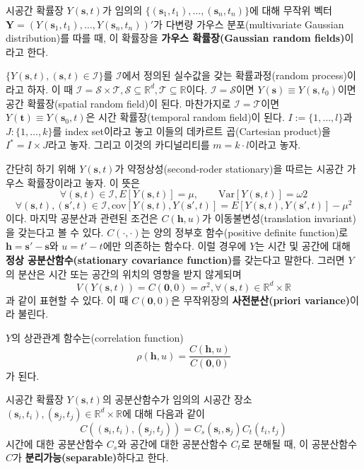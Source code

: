 \documentclass[b5paper,]{scrbook}
\theoremstyle{plain}
\theoremstyle{definition}
\numberwithin{equation}{section}
\let\BeginKnitrBlock\begin \let\EndKnitrBlock\end
\begin{document}
\BeginKnitrBlock{definition}[가우스 확률장]
\protect\hypertarget{def:unnamed-chunk-377}{}{\label{def:unnamed-chunk-377} {} }시공간 확률장 \(Y(\mathbf{s},t)\)가 임의의 \(\{(\mathbf{s}_{1},t_{1}),\ldots , (\mathbf{s}_{n},t_{n})\}\)에 대해 무작위 벡터 \(\mathbf{Y}=(Y(\mathbf{s}_{1},t_{1}),\ldots , Y(\mathbf{s}_{n},t_{n}) )'\)가 다변량 가우스 분포(multivariate Gaussian distribution)를 따를 때, 이 확률장을 \textbf{가우스 확률장(Gaussian random fields)}이라고 한다.
\EndKnitrBlock{definition}

\(\{ Y(\mathbf{s},t), (\mathbf{s},t) \in \mathcal{I}\}\)를 \(\mathcal{I}\)에서 정의된 실수값을 갖는 확률과정(random process)이라고 하자. 이 때 \(\mathcal{I}=\mathcal{S}\times\mathcal{T}, \mathcal{S}\subseteq \mathbb{R}^{d}, \mathcal{T}\subseteq \mathbb{R}\)이다. \(\mathcal{I}=\mathcal{S}\)이면 \(Y(\mathbf{s})\equiv Y(\mathbf{s},t_{0})\)이면 공간 확률장(spatial random field)이 된다. 마찬가지로 \(\mathcal{I}=\mathcal{T}\)이면 \(Y(\mathbf{t})\equiv Y(\mathbf{s}_{0},t)\)은 시간 확률장(temporal random field)이 된다. \(I:=\{1,\ldots , l\}\)과 \(J:\{ 1, \ldots, k \}\)를 index set이라고 놓고 이들의 데카르트 곱(Cartesian product)을 \(I^{*}=I\times J\)라고 놓자. 그리고 이것의 카디널리티를 \(m=k\cdot l\)이라고 놓자.

간단히 하기 위해 \(Y(\mathbf{s},t)\)가 약정상성(second-roder stationary)을 따르는 시공간 가우스 확률장이라고 놓자. 이 뜻은
\[\forall (\mathbf{s},t)\in\mathcal{I}, E[Y(\mathbf{s},t)]=\mu, \qquad{\text{Var}[Y(\mathbf{s},t)]=\omega{2}}\]
\[\forall (\mathbf{s},t), (\mathbf{s}',t)\in\mathcal{I}, \text{cov}[Y(\mathbf{s},t), Y(\mathbf{s}',t)]=E[Y(\mathbf{s},t), Y(\mathbf{s}',t)]-\mu^{2}\]
이다. 마지막 공분산과 관련된 조건은 \(C(\mathbf{h}, u)\)가 이동불변성(translation invariant)을 갖는다고 볼 수 있다. \(C(\cdot, \cdot)\)는 양의 정부호 함수(positive definite function)로 \(\mathbf{h}=\mathbf{s}'-\mathbf{s}\)와 \(u=t'-t\)에만 의존하는 함수다. 이럴 경우에 \(Y\)는 시간 및 공간에 대해 \textbf{정상 공분산함수(stationary covariance function)}를 갖는다고 말한다. 그러면 \(Y\)의 분산은 시간 또는 공간의 위치의 영향을 받지 않게되며
\[V(Y(\mathbf{s},t))=C(\mathbf{0},0)=\sigma^{2}, \forall (\mathbf{s},t)\in\mathbb{R}^{d}\times\mathbb{R}\]
과 같이 표현할 수 있다. 이 때 \(C(\mathbf{0},0)\)은 무작위장의 \textbf{사전분산(priori variance)}이라 불린다.

\(Y\)의 상관관계 함수는(correlation function)
\[\rho (\mathbf{h}, u )=\frac{C(\mathbf{h}, u )}{C (\mathbf{0}, 0 )}\]
가 된다.

\BeginKnitrBlock{definition}[분리가능]
\protect\hypertarget{def:unnamed-chunk-378}{}{\label{def:unnamed-chunk-378} {} }시공간 확률장 \(Y(\mathbf{s},t)\)의 공분산함수가 임의의 시공간 장소 \((\mathbf{s}_{i}, t_{i}),(\mathbf{s}_{j}, t_{j})\in\mathbb{R}^{d}\times \mathbb{R}\)에 대해 다음과 같이
\[C((\mathbf{s}_{i}, t_{i}), (\mathbf{s}_{j}, t_{j}))=C_{s}(\mathbf{s}_{i},\mathbf{s}_{j})C_{t}(t_{i},t_{j})\]
시간에 대한 공분산함수 \(C_{s}\)와 공간에 대한 공분산함수 \(C_{t}\)로 분해될 때, 이 공분산함수 \(C\)가 \textbf{분리가능(separable)}하다고 한다.
\EndKnitrBlock{definition}
\end{document}
